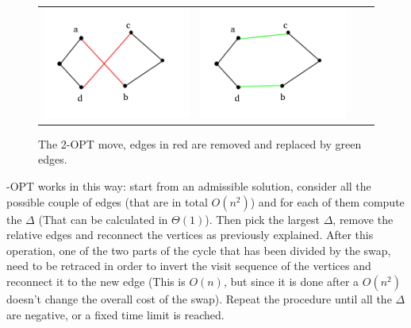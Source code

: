 \begin{figure}[h!]
\centering
	\begin{tabular}{@{}cccc@{}}
		\includegraphics[scale=0.6]{media/2-opt1.png} &
		\includegraphics[scale=0.6]{media/2-opt2.png} \\
	\end{tabular}
	\caption{The 2-OPT move, edges in red are removed and replaced by green edges.}
\end{figure}

-OPT works in this way: start from an admissible solution, consider all the possible couple of edges (that are in total $O(n^2)$) and for each of them compute the $\Delta$ (That can be calculated in $\Theta(1)$). Then pick the largest $\Delta$, remove the relative edges and reconnect the vertices as previously explained. After this operation, one of the two parts of the cycle that has been divided by the swap, need to be retraced in order to invert the visit sequence of the vertices and reconnect it to the new edge (This is $O(n)$, but since it is done after a $O(n^2)$ doesn't change the overall cost of the swap). Repeat the procedure until all the $\Delta$ are negative, or a fixed time limit is reached.\\

